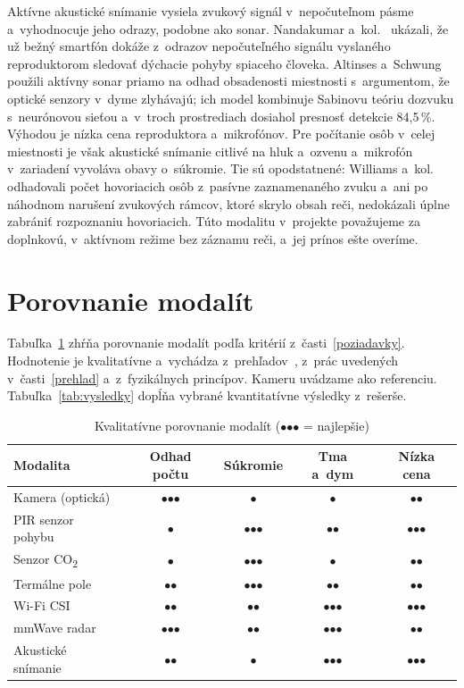 \documentclass[10pt,twoside,a4paper]{article}
\newcommand{\mb}{$\bullet$}
\begin{document}
Aktívne akustické snímanie vysiela zvukový signál v~nepočuteľnom pásme a~vyhodnocuje jeho odrazy, podobne ako sonar. Nandakumar a~kol.~\cite{nandakumar2015apnea} ukázali, že už bežný smartfón dokáže z~odrazov nepočuteľného signálu vyslaného reproduktorom sledovať dýchacie pohyby spiaceho človeka. Altinses a~Schwung~\cite{altinses2026sonar} použili aktívny sonar priamo na odhad obsadenosti miestnosti s~argumentom, že optické senzory v~dyme zlyhávajú; ich model kombinuje Sabinovu teóriu dozvuku s~neurónovou sieťou a~v~troch prostrediach dosiahol presnosť detekcie 84,5\,\%. Výhodou je nízka cena reproduktora a~mikrofónov. Pre počítanie osôb v~celej miestnosti je však akustické snímanie citlivé na hluk a~ozvenu a~mikrofón v~zariadení vyvoláva obavy o~súkromie. Tie sú opodstatnené: Williams a~kol.~\cite{williams2023audio} odhadovali počet hovoriacich osôb z~pasívne zaznamenaného zvuku a~ani po náhodnom narušení zvukových rámcov, ktoré skrylo obsah reči, nedokázali úplne zabrániť rozpoznaniu hovoriacich. Túto modalitu v~projekte považujeme za doplnkovú, v~aktívnom režime bez záznamu reči, a~jej prínos ešte overíme.

\section{Porovnanie modalít}\label{porovnanie}

Tabuľka~\ref{tab:porovnanie} zhŕňa porovnanie modalít podľa kritérií z~časti~\ref{poziadavky}. Hodnotenie je kvalitatívne a~vychádza z~prehľadov~\cite{sun2020review,chen2018review,ma2019wifi,shahbazian2023survey}, z~prác uvedených v~časti~\ref{prehlad} a~z~fyzikálnych princípov. Kameru uvádzame ako referenciu. Tabuľka~\ref{tab:vysledky} dopĺňa vybrané kvantitatívne výsledky z~rešerše.

\begin{table}[ht]
\centering
\caption{Kvalitatívne porovnanie modalít (\mb\mb\mb{} = najlepšie)}\label{tab:porovnanie}
\small
\begin{tabular}{@{}lcccc@{}}
\toprule
Modalita & Odhad počtu & Súkromie & Tma a~dym & Nízka cena \\
\midrule
Kamera (optická)      & \mb\mb\mb & \mb       & \mb       & \mb\mb    \\
PIR senzor pohybu     & \mb       & \mb\mb\mb & \mb\mb    & \mb\mb\mb \\
Senzor CO\textsubscript{2} & \mb  & \mb\mb\mb & \mb       & \mb\mb    \\
Termálne pole         & \mb\mb    & \mb\mb\mb & \mb\mb    & \mb\mb    \\
Wi-Fi CSI             & \mb\mb    & \mb\mb    & \mb\mb\mb & \mb\mb\mb \\
mmWave radar          & \mb\mb\mb & \mb\mb    & \mb\mb\mb & \mb\mb    \\
Akustické snímanie    & \mb\mb    & \mb       & \mb\mb\mb & \mb\mb\mb \\
\bottomrule
\end{tabular}
\end{table}
\end{document}
